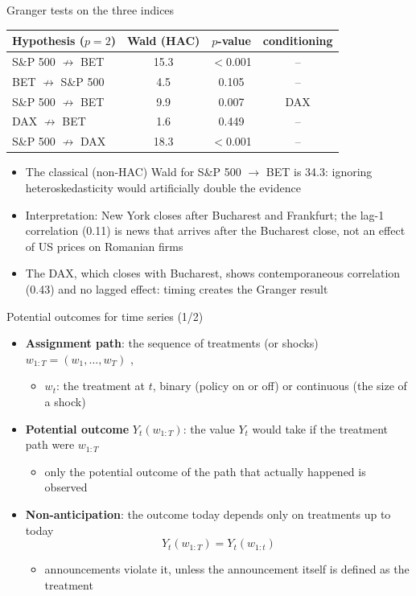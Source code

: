 \begin{frame}{Granger tests on the three indices}
\itemsize{\small}
\begin{center}
\footnotesize
\begin{tabular}{lccc}
\toprule
\textbf{Hypothesis} ($p = 2$) & \textbf{Wald (HAC)} & $p$\textbf{-value} & \textbf{conditioning} \\
\midrule
S\&P 500 $\not\to$ BET & 15.3 & $<$0.001 & -- \\
BET $\not\to$ S\&P 500 & 4.5 & 0.105 & -- \\
S\&P 500 $\not\to$ BET & 9.9 & 0.007 & DAX \\
DAX $\not\to$ BET & 1.6 & 0.449 & -- \\
S\&P 500 $\not\to$ DAX & 18.3 & $<$0.001 & -- \\
\bottomrule
\end{tabular}
\end{center}
\begin{itemize}
    \item The classical (non-HAC) Wald for S\&P 500 $\to$ BET is 34.3: ignoring heteroskedasticity would artificially double the evidence
    \item Interpretation: New York closes after Bucharest and Frankfurt; the lag-1 correlation (0.11) is news that arrives after the Bucharest close, not an effect of US prices on Romanian firms
    \item The DAX, which closes with Bucharest, shows contemporaneous correlation (0.43) and no lagged effect: timing creates the Granger result
\end{itemize}
\end{frame}

\begin{frame}{Potential outcomes for time series (1/2)}
\itemsize{\small}
\begin{itemize}
    \item \textbf{Assignment path}: the sequence of treatments (or shocks) $w_{1:T} = (w_1, \dots, w_T)$ , 
    \begin{itemize}
        \item $w_t$: the treatment at $t$, binary (policy on or off) or continuous (the size of a shock)
    \end{itemize}
    \item \textbf{Potential outcome} $Y_t(w_{1:T})$: the value $Y_t$ would take if the treatment path were $w_{1:T}$
    \begin{itemize}
        \item only the potential outcome of the path that actually happened is observed
    \end{itemize}
    \item \textbf{Non-anticipation}: the outcome today depends only on treatments up to today \[ Y_t(w_{1:T}) = Y_t(w_{1:t}) \]
    \begin{itemize}
        \item announcements violate it, unless the announcement itself is defined as the treatment
    \end{itemize}
\end{itemize}
\end{frame}

